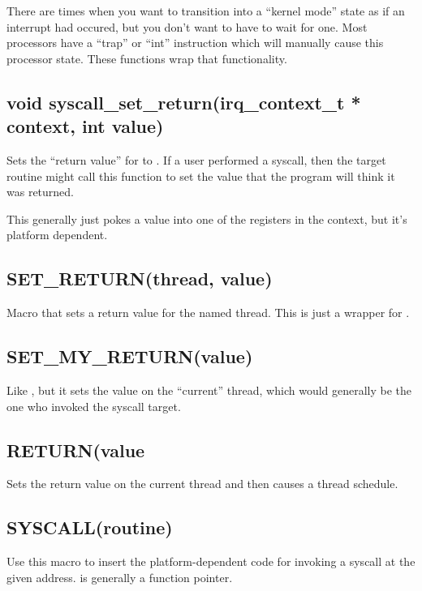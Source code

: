 \documentclass[english]{report}
\begin{document}
There are times when you want to transition into a ``kernel mode''
state as if an interrupt had occured, but you don't want to have to
wait for one. Most processors have a ``trap'' or ``int'' instruction
which will manually cause this processor state. These functions wrap
that functionality.

\subsection{void syscall\_set\_return(irq\_context\_t * context, int value)}

Sets the ``return value'' for  to .
If a user performed a syscall, then the target routine might call this
function to set the value that the program will think it was returned.

This generally just pokes a value into one of the registers in the context,
but it's platform dependent.

\subsection{SET\_RETURN(thread, value)}

Macro that sets a return value for the named thread. This is just a wrapper
for .

\subsection{SET\_MY\_RETURN(value)}

Like , but it sets the value on the ``current''
thread, which would generally be the one who invoked the syscall target.

\subsection{RETURN(value}

Sets the return value on the current thread and then causes a thread
schedule.

\subsection{SYSCALL(routine)}

Use this macro to insert the platform-dependent code for invoking a syscall
at the given address.  is generally a function pointer.
\end{document}

